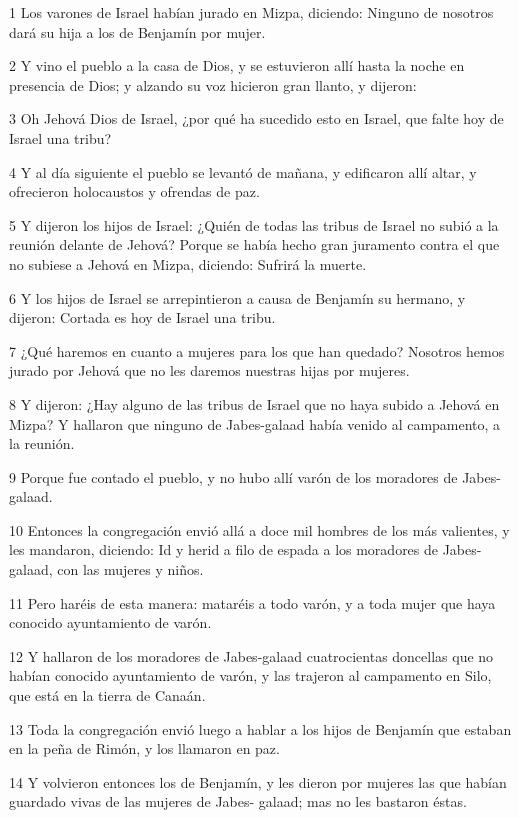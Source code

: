 \par 1 Los varones de Israel habían jurado en Mizpa, diciendo: Ninguno de nosotros dará su hija a los de Benjamín por mujer.
\par 2 Y vino el pueblo a la casa de Dios, y se estuvieron allí hasta la noche en presencia de Dios; y alzando su voz hicieron gran llanto, y dijeron:
\par 3 Oh Jehová Dios de Israel, ¿por qué ha sucedido esto en Israel, que falte hoy de Israel una tribu?
\par 4 Y al día siguiente el pueblo se levantó de mañana, y edificaron allí altar, y ofrecieron holocaustos y ofrendas de paz.
\par 5 Y dijeron los hijos de Israel: ¿Quién de todas las tribus de Israel no subió a la reunión delante de Jehová? Porque se había hecho gran juramento contra el que no subiese a Jehová en Mizpa, diciendo: Sufrirá la muerte.
\par 6 Y los hijos de Israel se arrepintieron a causa de Benjamín su hermano, y dijeron: Cortada es hoy de Israel una tribu.
\par 7 ¿Qué haremos en cuanto a mujeres para los que han quedado? Nosotros hemos jurado por Jehová que no les daremos nuestras hijas por mujeres.
\par 8 Y dijeron: ¿Hay alguno de las tribus de Israel que no haya subido a Jehová en Mizpa? Y hallaron que ninguno de Jabes-galaad había venido al campamento, a la reunión.
\par 9 Porque fue contado el pueblo, y no hubo allí varón de los moradores de Jabes-galaad. 
\par 10 Entonces la congregación envió allá a doce mil hombres de los más valientes, y les mandaron, diciendo: Id y herid a filo de espada a los moradores de Jabes-galaad, con las mujeres y niños.
\par 11 Pero haréis de esta manera: mataréis a todo varón, y a toda mujer que haya conocido ayuntamiento de varón.
\par 12 Y hallaron de los moradores de Jabes-galaad cuatrocientas doncellas que no habían conocido ayuntamiento de varón, y las trajeron al campamento en Silo, que está en la tierra de Canaán.
\par 13 Toda la congregación envió luego a hablar a los hijos de Benjamín que estaban en la peña de Rimón, y los llamaron en paz.
\par 14 Y volvieron entonces los de Benjamín, y les dieron por mujeres las que habían guardado vivas de las mujeres de Jabes- galaad; mas no les bastaron éstas.
